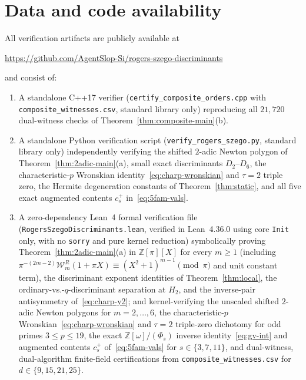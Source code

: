 \documentclass[11pt,reqno]{amsart}
\numberwithin{equation}{section}
\theoremstyle{definition}
\theoremstyle{remark}
\newcommand{\Z}{\mathbb{Z}}
\begin{document}
\section*{Data and code availability}
All verification artifacts are publicly available at
\begin{center}
\url{https://github.com/AgentSlop-Si/rogers-szego-discriminants}
\end{center}
and consist of:
\begin{enumerate}[label=(\arabic*),leftmargin=2em]
\item A standalone C++17 verifier (\texttt{certify\_composite\_orders.cpp} with \texttt{composite\_witnesses.csv}, standard library only) reproducing all $21{,}720$ dual-witness checks of Theorem~\ref{thm:composite-main}(b).
\item A standalone Python verification script (\texttt{verify\_rogers\_szego.py}, standard library only) independently verifying the shifted $2$-adic Newton polygon of Theorem~\ref{thm:2adic-main}(a), small exact discriminants $D_2$--$D_6$, the characteristic-$p$ Wronskian identity~\eqref{eq:charp-wronskian} and $\tau=2$ triple zero, the Hermite degeneration constants of Theorem~\ref{thm:static}, and all five exact augmented contents $c_s^+$ in~\eqref{eq:5fam-vals}.
\item A zero-dependency Lean~4 formal verification file (\texttt{RogersSzegoDiscriminants.lean}, verified in Lean~4.36.0 using core \texttt{Init} only, with no \texttt{sorry} and pure kernel reduction) symbolically proving Theorem~\ref{thm:2adic-main}(a) in $\Z[\pi][X]$ for every $m\ge 1$ (including $\pi^{-(2m-2)}\mathcal{W}_m^R(1+\pi X)\equiv (X^2+1)^{m-1}\pmod{\pi}$ and unit constant term), the discriminant exponent identities of Theorem~\ref{thm:local}, the ordinary-vs.-$q$-discriminant separation at $H_2$, and the inverse-pair antisymmetry of~\eqref{eq:charp-y2}; and kernel-verifying the unscaled shifted $2$-adic Newton polygons for $m=2,\ldots,6$, the characteristic-$p$ Wronskian~\eqref{eq:charp-wronskian} and $\tau=2$ triple-zero dichotomy for odd primes $3\le p\le 19$, the exact $\Z[\omega]/(\Phi_s)$ inverse identity~\eqref{eq:gv-int} and augmented contents $c_s^+$ of~\eqref{eq:5fam-vals} for $s\in\{3,7,11\}$, and dual-witness, dual-algorithm finite-field certifications from \texttt{composite\_witnesses.csv} for $d\in\{9,15,21,25\}$.
\end{enumerate}



\end{document}
